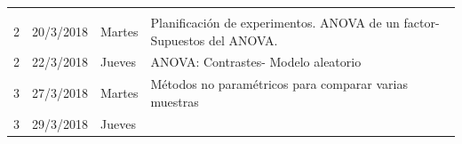 \documentclass[]{book}
\theoremstyle{definition}
\theoremstyle{definition}
\theoremstyle{definition}
\theoremstyle{remark}
\begin{document}
\begin{longtable}[]{@{}llll@{}}
\begin{minipage}[t]{0.71\columnwidth}
\end{minipage}\tabularnewline
\begin{minipage}[t]{0.05\columnwidth}\raggedright
2\strut
\end{minipage} & \begin{minipage}[t]{0.07\columnwidth}\raggedright
20/3/2018\strut
\end{minipage} & \begin{minipage}[t]{0.05\columnwidth}\raggedright
Martes\strut
\end{minipage} & \begin{minipage}[t]{0.71\columnwidth}\raggedright
Planificación de experimentos. ANOVA de un factor- Supuestos del
ANOVA.\strut
\end{minipage}\tabularnewline
\begin{minipage}[t]{0.05\columnwidth}\raggedright
2\strut
\end{minipage} & \begin{minipage}[t]{0.07\columnwidth}\raggedright
22/3/2018\strut
\end{minipage} & \begin{minipage}[t]{0.05\columnwidth}\raggedright
Jueves\strut
\end{minipage} & \begin{minipage}[t]{0.71\columnwidth}\raggedright
ANOVA: Contrastes- Modelo aleatorio\strut
\end{minipage}\tabularnewline
\begin{minipage}[t]{0.05\columnwidth}\raggedright
3\strut
\end{minipage} & \begin{minipage}[t]{0.07\columnwidth}\raggedright
27/3/2018\strut
\end{minipage} & \begin{minipage}[t]{0.05\columnwidth}\raggedright
Martes\strut
\end{minipage} & \begin{minipage}[t]{0.71\columnwidth}\raggedright
Métodos no paramétricos para comparar varias muestras\strut
\end{minipage}\tabularnewline
\begin{minipage}[t]{0.05\columnwidth}\raggedright
3\strut
\end{minipage} & \begin{minipage}[t]{0.07\columnwidth}\raggedright
29/3/2018\strut
\end{minipage} & \begin{minipage}[t]{0.05\columnwidth}\raggedright
Jueves\strut
\end{minipage} & \begin{minipage}[t]{0.71\columnwidth}\raggedright

\end{minipage}
\end{longtable}
\end{document}
